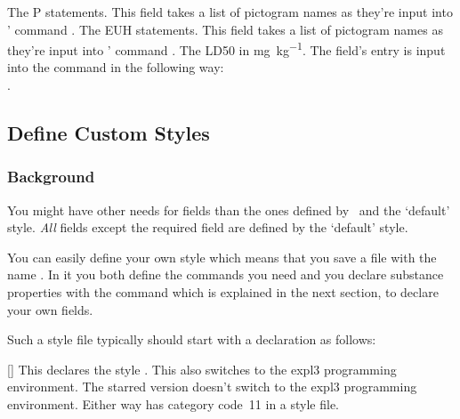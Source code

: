 \documentclass[load-preamble+]{cnltx-doc}
\begin{document}
\begin{options}
    The P statements. This field takes a list of pictogram names as they're
    input into ' command .
    The EUH statements. This field takes a list of pictogram names as they're
    input into ' command .
    The \ac{LD50} in \si{\milli\gram\per\kilo\gram}. The field's entry is
    input into the  command  in the following way: \\
    .
\end{options}

\subsection{Define Custom Styles}\label{ssec:styles}
\subsubsection{Background}
You might have other needs for fields than the ones defined by \substances\
and the `default' style.  \emph{All} fields except the required 
field are defined by the `default' style.

You can easily define your own style which means that you save a file with the
name \code{substances-\meta{style}.def}. In it you both define the commands
you need and you declare substance properties with the command
 which is explained in the next section, to
declare your own fields.


Such a style file typically should start with a declaration as follows:
\begin{commands}
  [\sarg{}]
    This declares the style . This also switches to the expl3
    programming environment.  The starred version doesn't switch to the expl3
    programming environment.  Either way \code{@} has category code~11 in a
    style file.
\end{commands}
\end{document}
